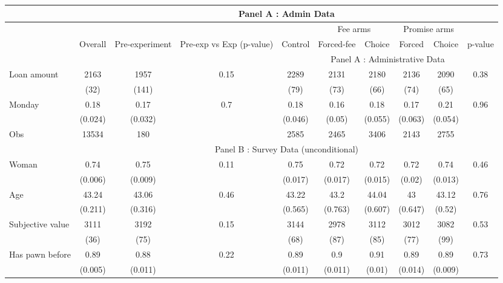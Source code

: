 \begin{tabular}{lccccccccc}
\toprule
      & \multicolumn{9}{c}{Panel A : Admin Data } \\
\midrule
      &       &       &       &       & \multicolumn{2}{c}{Fee arms} & \multicolumn{2}{c}{Promise arms} &  \\
\midrule
\midrule
      & \multicolumn{1}{p{3.5em}}{Overall} & \multicolumn{1}{p{5.865em}}{Pre-experiment} & \multicolumn{1}{p{6.59em}}{Pre-exp vs Exp (p-value)} & \multicolumn{1}{p{4.045em}}{Control} & \multicolumn{1}{p{4.955em}}{Forced-fee} & \multicolumn{1}{p{4.045em}}{Choice} & \multicolumn{1}{p{4.045em}}{Forced} & \multicolumn{1}{p{4.045em}}{Choice } & \multicolumn{1}{p{3.275em}}{p-value} \\
\midrule
      &       &       &       & \multicolumn{6}{c}{Panel A : Administrative Data} \\
\midrule
\midrule
Loan amount  & 2163  & 1957  & 0.15  & 2289  & 2131  & 2180  & 2136  & 2090  & 0.38 \\
      & (32)  & (141) &       & (79)  & (73)  & (66)  & (74)  & (65)  &  \\
Monday & 0.18  & 0.17  & 0.7   & 0.18  & 0.16  & 0.18  & 0.17  & 0.21  & 0.96 \\
      & (0.024) & (0.032) &       & (0.046) & (0.05) & (0.055) & (0.063) & (0.054) &  \\
\midrule
Obs   & 13534 & 180   &       & 2585  & 2465  & 3406  & 2143  & 2755  &  \\
\midrule
      & \multicolumn{9}{c}{Panel B : Survey Data (unconditional)} \\
\midrule
Woman & 0.74  & 0.75  & 0.11  & 0.75  & 0.72  & 0.72  & 0.72  & 0.74  & 0.46 \\
      & (0.006) & (0.009) &       & (0.017) & (0.017) & (0.015) & (0.02) & (0.013) &  \\
Age   & 43.24 & 43.06 & 0.46  & 43.22 & 43.2  & 44.04 & 43    & 43.12 & 0.76 \\
      & (0.211) & (0.316) &       & (0.565) & (0.763) & (0.607) & (0.647) & (0.52) &  \\
Subjective value & 3111  & 3192  & 0.15  & 3144  & 2978  & 3112  & 3012  & 3082  & 0.53 \\
      & (36)  & (75)  &       & (68)  & (87)  & (85)  & (77)  & (99)  &  \\
Has pawn before & 0.89  & 0.88  & 0.22  & 0.89  & 0.9   & 0.91  & 0.89  & 0.89  & 0.73 \\
      & (0.005) & (0.011) &       & (0.011) & (0.011) & (0.01) & (0.014) & (0.009) &  \\

\end{tabular}

